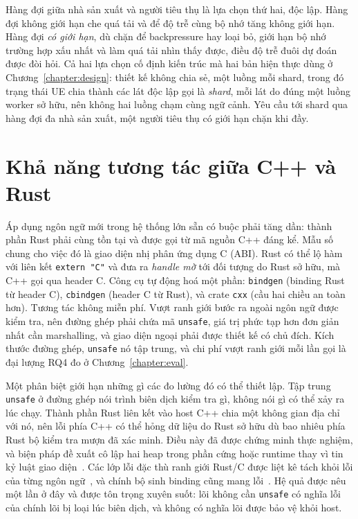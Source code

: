 Hàng đợi giữa nhà sản xuất và người tiêu thụ là lựa chọn thứ hai, độc lập. Hàng đợi không giới
hạn che quá tải và để độ trễ cùng bộ nhớ tăng không giới hạn. Hàng đợi \emph{có giới hạn}, dù
chặn để backpressure hay loại bỏ, giới hạn bộ nhớ trường hợp xấu nhất và làm quá tải nhìn thấy
được, điều độ trễ đuôi dự đoán được đòi hỏi. Cả hai lựa chọn cố định kiến trúc mà hai bản hiện
thực dùng ở Chương~\ref{chapter:design}: thiết kế không chia sẻ, một luồng mỗi shard, trong đó
trạng thái UE chia thành các lát độc lập gọi là \emph{shard}, mỗi lát do đúng một luồng worker
sở hữu, nên không hai luồng chạm cùng ngữ cảnh. Yêu cầu tới shard qua hàng đợi đa nhà sản xuất,
một người tiêu thụ có giới hạn chặn khi đầy.

\section{Khả năng tương tác giữa C++ và Rust}\label{sec:interop}
Áp dụng ngôn ngữ mới trong hệ thống lớn sẵn có buộc phải tăng dần: thành phần Rust phải cùng
tồn tại và được gọi từ mã nguồn C++ đáng kể. Mẫu số chung cho việc đó là giao diện nhị phân
ứng dụng C (ABI). Rust có thể lộ hàm với liên kết \texttt{extern "C"} và đưa ra \emph{handle
mờ} tới đối tượng do Rust sở hữu, mà C++ gọi qua header C. Công cụ tự động hoá một phần:
\texttt{bindgen} (binding Rust từ header C), \texttt{cbindgen} (header C từ Rust), và crate
\texttt{cxx} (cầu hai chiều an toàn hơn). Tương tác không miễn phí. Vượt ranh giới bước ra ngoài
ngôn ngữ được kiểm tra, nên đường ghép phải chứa mã \texttt{unsafe}, giá trị phức tạp hơn đơn
giản nhất cần marshalling, và giao diện ngoại phải được thiết kế có chủ đích. Kích thước đường
ghép, \texttt{unsafe} nó tập trung, và chi phí vượt ranh giới mỗi lần gọi là đại lượng RQ4 đo
ở Chương~\ref{chapter:eval}.

Một phân biệt giới hạn những gì các đo lường đó có thể thiết lập. Tập trung \texttt{unsafe} ở
đường ghép nói trình biên dịch kiểm tra gì, không nói gì có thể xảy ra lúc chạy. Thành phần Rust
liên kết vào host C++ chia một không gian địa chỉ với nó, nên lỗi phía C++ có thể hỏng dữ liệu
do Rust sở hữu dù bao nhiêu phía Rust bộ kiểm tra mượn đã xác minh. Điều này đã được chứng minh
thực nghiệm, và biện pháp đề xuất cô lập hai heap trong phần cứng hoặc runtime thay vì tin kỷ
luật giao
diện~\cite{rivera2021galeed,kirth2022pkrusafe}. Các lớp lỗi đặc thù ranh giới Rust/C được liệt
kê tách khỏi lỗi của từng
ngôn ngữ~\cite{li2022crosslang}, và chính bộ sinh binding cũng mang
lỗi~\cite{cai2026interop}. Hệ quả được nêu một lần ở đây và được tôn trọng xuyên suốt: lõi không
cần \texttt{unsafe} có nghĩa lỗi của chính lõi bị loại lúc biên dịch, và không có nghĩa lõi
được bảo vệ khỏi host.

